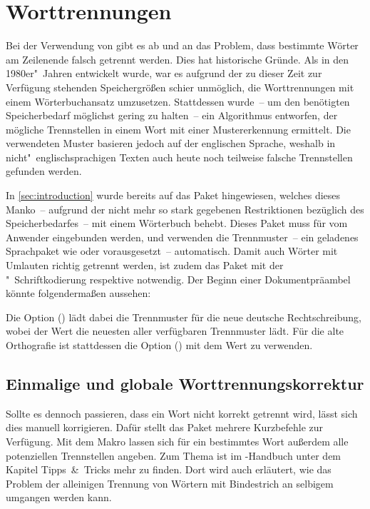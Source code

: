 \documentclass[%
  english,ngerman,%
  cdgeometry=no,DIV=12,%
  cd=false,cdfont=false,cdtitle=true,%
  headings=normal,%
  automark,%
  listof=toc,%
]{tudscrartcl}
\begin{document}
\section{Worttrennungen}
\label{sec:hyphenation}%
%
Bei der Verwendung von  gibt es ab und an das Problem, dass 
bestimmte Wörter am Zeilenende falsch getrennt werden. Dies hat historische 
Gründe. Als  in den 1980er"~Jahren entwickelt wurde, war es 
aufgrund der zu dieser Zeit zur Verfügung stehenden Speichergrößen schier 
unmöglich, die Worttrennungen mit einem Wörterbuchansatz umzusetzen. 
Stattdessen wurde~-- um den benötigten Speicherbedarf möglichst gering zu 
halten~-- ein Algorithmus entworfen, der mögliche Trennstellen in einem Wort 
mit einer Mustererkennung ermittelt. Die verwendeten Muster basieren jedoch 
auf der englischen Sprache, weshalb in nicht"~englischsprachigen Texten auch 
heute noch teilweise falsche Trennstellen gefunden werden.

In \autoref{sec:introduction} wurde bereits auf das Paket 
 hingewiesen, welches dieses Manko~-- aufgrund der nicht 
mehr so stark gegebenen Restriktionen bezüglich des Speicherbedarfes~-- mit 
einem Wörterbuch behebt. Dieses Paket muss für  vom Anwender 
eingebunden werden,  und  verwenden die 
Trennmuster~-- ein geladenes Sprachpaket wie  oder 
 vorausgesetzt~-- automatisch. Damit auch Wörter mit Umlauten 
richtig getrennt werden, ist zudem das Paket  mit der 
"~Schriftkodierung respektive  notwendig. Der 
Beginn einer Dokumentpräambel könnte folgendermaßen aussehen:
%
%
Die Option () lädt dabei die Trennmuster für 
die neue deutsche Rechtschreibung, wobei der Wert  die 
neuesten aller verfügbaren Trennmuster lädt. Für die alte Orthografie ist 
stattdessen die Option () mit dem Wert 
 zu verwenden.


\subsection{Einmalige und globale Worttrennungskorrektur}
Sollte es dennoch passieren, dass ein Wort nicht korrekt getrennt wird, lässt
sich dies manuell korrigieren. Dafür stellt das Paket  mehrere 
Kurzbefehle zur Verfügung. Mit dem Makro  lassen sich für 
ein bestimmtes Wort außerdem alle potenziellen Trennstellen angeben. Zum Thema 
ist im \TUDScript-Handbuch unter dem Kapitel Tipps~\&~Tricks mehr zu finden. 
Dort wird auch erläutert, wie das Problem der alleinigen Trennung von Wörtern 
mit Bindestrich an selbigem umgangen werden kann.
\end{document}
